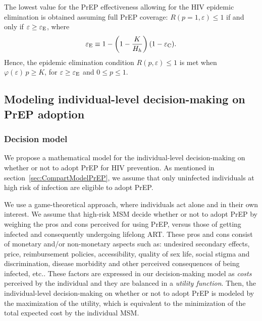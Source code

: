 \documentclass[12pt]{article}
\begin{document}
The lowest value for the PrEP effectiveness allowing for the HIV epidemic elimination is obtained assuming full PrEP coverage: $R(p=1,\varepsilon) \leq 1$ if and only if $\varepsilon\geq\varepsilon_{\rm E}$, where
\begin{equation}
	\varepsilon_{\rm E} \equiv 1- \left( 1- \frac{K}{H_h}\right) (1-\varepsilon_{\rm C}).
\end{equation}
Hence, the epidemic elimination condition $R(p,\varepsilon) \leq 1$ is met when $\varphi(\varepsilon) \, p \geq K$, for  $\varepsilon\geq\varepsilon_{\rm E}$ and $0\leq p\leq 1$.


\subsection{Modeling individual-level decision-making on PrEP adoption} \label{sec:DecisionMaking}
\subsubsection{Decision model} \label{sec:DecisionModel}

We propose a mathematical model for the individual-level decision-making on whether or not to adopt PrEP for HIV prevention. As mentioned in section~\ref{sec:CompartModelPrEP}, we assume that only uninfected individuals at high risk of infection are eligible to adopt PrEP. 

We use a game-theoretical approach, where individuals act alone and in their own interest. {We assume that high-risk MSM decide whether or not to adopt PrEP by weighing the pros and cons perceived for using PrEP, versus those of getting infected and  consequently undergoing lifelong ART.} These pros and cons consist of monetary and/or non-monetary aspects such as: undesired secondary effects, price, reimbursement policies, accessibility, {quality of sex life, social stigma and discrimination}, disease morbidity {and other perceived consequences of being infected}, etc.\cite{Arnold2016,Gilson2018,Thomann2017,Brooks2019}. {These factors are expressed in our decision-making model} as \textit{costs} perceived by the individual and they are balanced in a \textit{utility function}. Then, the individual-level decision-making on whether or not to adopt PrEP is modeled by the maximization of the utility, which is equivalent to the minimization of the total expected cost by the individual MSM.
\end{document}
